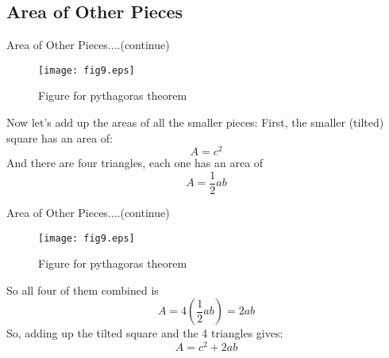 \documentclass[10pt]{beamer}
\begin{document}
\subsection{Area of Other Pieces}
\label{a_pieces}
\begin{frame}{Area of Other Pieces....(continue)}
\begin{figure}[htb!]
  \begin{center}
    \texttt{[image: fig9.eps]}
   \end{center}
  \caption{Figure for pythagoras theorem}
  \label{image1}
\end{figure}

Now let's add up the areas of all the smaller pieces:\newline
First, the smaller (tilted) square has an area of:
\begin{equation}
\label{two}
A = c^2 
\end{equation} 
And there are four triangles, each one has an area of 
\begin{equation}
\label{three}
A =\frac{1}{2} ab
\end{equation}
\end{frame}

\begin{frame}{Area of Other Pieces....(continue)}
\begin{figure}[htb!]
  \begin{center}
    \texttt{[image: fig9.eps]}
   \end{center}
  \caption{Figure for pythagoras theorem}
  \label{image1}
\end{figure}

So all four of them combined is	
\begin{equation}
\label{two}
A = 4(\frac{1}{2}ab) = 2ab
\end{equation} 
So, adding up the tilted square and the 4 triangles gives: 
\begin{equation}
\label{five}
A = c^2 +2ab
\end{equation}
\end{frame}
\end{document}

